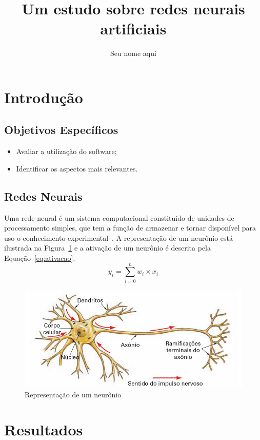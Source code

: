 \documentclass[a4paper, 12pt]{article}
\author{Seu nome aqui}
\title{Um estudo sobre redes neurais artificiais}
\begin{document}
	\maketitle
\section{Introdução}
\subsection{Objetivos Específicos}
\begin{itemize}
	\item Avaliar a utilização do software;
	\item Identificar os aspectos mais relevantes.
\end{itemize}
\subsection{Redes Neurais}
Uma rede neural é um sistema computacional constituído de unidades de processamento simples, que tem a função de armazenar e tornar disponível para uso o conhecimento experimental~\cite{haykinredes, LeCun1990}.
A representação de um neurônio está ilustrada na Figura~\ref{fig:neuronio} e a ativação de um neurônio é descrita pela Equação~\ref{eq:ativacao}. 
\begin{equation}
y_i = \sum_{i=0}^{n} w_i \times x_i
\end{equation}\label{eq:ativacao}

\begin{figure}[htb]
	\centering
	\includegraphics[scale=.3]{neuronio}
	\caption{Representação de um neurônio}\label{fig:neuronio}
\end{figure}
\clearpage
\section{Resultados}
\lstset{language=Python}





\end{document}
